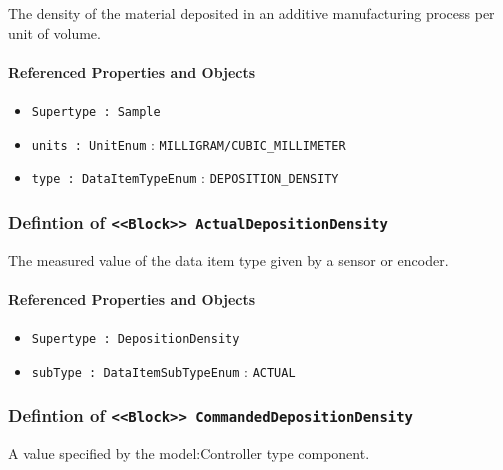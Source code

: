 \FloatBarrier

The density of the material deposited in an additive manufacturing process per unit of volume.

\FloatBarrier
\paragraph{Referenced Properties and Objects}

\begin{itemize}
\item \texttt{Supertype : Sample}

\item \texttt{units : UnitEnum} : \texttt{MILLIGRAM/CUBIC_MILLIMETER}

\item \texttt{type : DataItemTypeEnum} : \texttt{DEPOSITION_DENSITY}

\end{itemize}
\FloatBarrier
\subsubsection{Defintion of \texttt{<<Block>> ActualDepositionDensity}}
  \label{type:ActualDepositionDensity}

\FloatBarrier

The measured value of the data item type given by a sensor or encoder.

\FloatBarrier
\paragraph{Referenced Properties and Objects}

\begin{itemize}
\item \texttt{Supertype : DepositionDensity}

\item \texttt{subType : DataItemSubTypeEnum} : \texttt{ACTUAL}

\end{itemize}
\FloatBarrier
\subsubsection{Defintion of \texttt{<<Block>> CommandedDepositionDensity}}
  \label{type:CommandedDepositionDensity}

\FloatBarrier

A value specified by the {model:Controller} type component.

